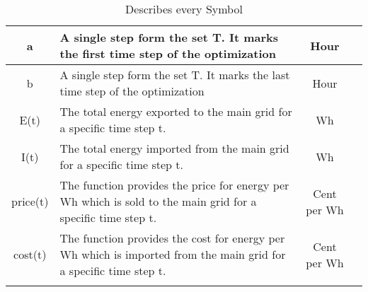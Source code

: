 \begin{longtable}{|c|p{}|c|c|}
		a & A single step form the set T. It marks the first time step of the optimization & Hour & \Cref{eq:opt} \\ \midrule
		b & A single step form the set T. It marks the last time step of the optimization & Hour & \Cref{eq:opt} \\ \midrule
		E(t) & The total energy exported to the main grid for a specific time step t. & Wh & \Cref{eq:opt} \\ \midrule
		I(t) & The total energy imported from the main grid for a specific time step t. & Wh & \Cref{eq:opt} \\ \midrule
		price(t) & The function provides the price for energy per Wh which is sold to the main grid for a specific time step t. & Cent per Wh & \Cref{eq:opt} \\ \midrule
		cost(t) & The function provides the cost for energy per Wh which is imported from the main grid for a specific time step t. & Cent per Wh& \Cref{eq:opt} \\
		\bottomrule
			\caption[Nomenclature Table]{Describes every Symbol}
		\label{tab:Ergebnisse}
	\end{longtable}


